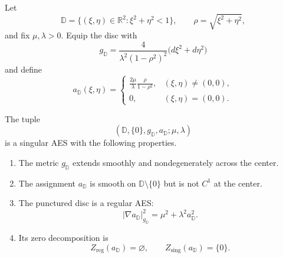 Let
\[
 \mathbb D=\{(\xi,\eta)\in\mathbb R^2:\xi^2+\eta^2<1\},
 \qquad
 \rho=\sqrt{\xi^2+\eta^2},
\]
and fix \(\mu,\lambda>0\).  Equip the disc with
\begin{equation}\label{eq:isolated-zero-disc-metric}
 g_{\mathbb D}
 =\frac4{\lambda^2(1-\rho^2)^2}
  \bigl(d\xi^2+d\eta^2\bigr)
\end{equation}
and define
\begin{equation}\label{eq:isolated-zero-disc-assignment}
 a_{\mathbb D}(\xi,\eta)
 =
 \begin{cases}
  \displaystyle\frac{2\mu}{\lambda}
  \frac{\rho}{1-\rho^2},&(\xi,\eta)\ne(0,0),\\[7pt]
  0,&(\xi,\eta)=(0,0).
 \end{cases}
\end{equation}

\begin{proposition}\label{prop:isolated-zero-singular-model}
The tuple
\[
 (\mathbb D,\{0\},g_{\mathbb D},a_{\mathbb D};\mu,\lambda)
\]
is a singular AES with the following properties.
\begin{enumerate}
\item The metric \(g_{\mathbb D}\) extends smoothly and
      nondegenerately across the center.
\item The assignment \(a_{\mathbb D}\) is smooth on
      \(\mathbb D\setminus\{0\}\) but is not \(C^1\) at the center.
\item The punctured disc is a regular AES:
      \[
      |\nabla a_{\mathbb D}|_{g_{\mathbb D}}^2
      =\mu^2+\lambda^2a_{\mathbb D}^2.
      \]
\item Its zero decomposition is
      \[
      Z_{\mathrm{reg}}(a_{\mathbb D})=\varnothing,
      \qquad
      Z_{\mathrm{sing}}(a_{\mathbb D})=\{0\}.
      \]
\end{enumerate}
\end{proposition}

